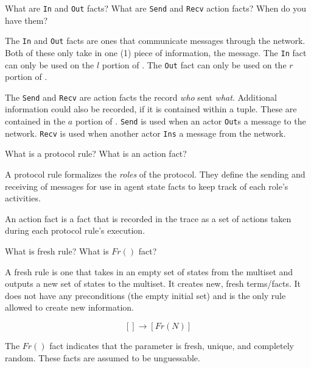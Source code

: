 \begin{questions}
\question{} What are \texttt{In} and \texttt{Out} facts? What are \texttt{Send} and \texttt{Recv} action facts? When do you have them?
  \begin{solution}
    The \texttt{In} and \texttt{Out} facts are ones that communicate messages through the network.
    Both of these only take in one (1) piece of information, the message.
    The \texttt{In} fact can only be used on the $l$ portion of .
    The \texttt{Out} fact can only be used on the $r$ portion of .

    The \texttt{Send} and \texttt{Recv} are action facts the record \emph{who} sent \emph{what}.
    Additional information could also be recorded, if it is contained within a tuple.
    These are contained in the $a$ portion of .
    \texttt{Send} is used when an actor \texttt{Out}s a message to the network.
    \texttt{Recv} is used when another actor \texttt{Ins} a message from the network.
  \end{solution}

\question{} What is a protocol rule? What is an action fact?
  \begin{solution}
    A protocol rule formalizes the \emph{roles} of the protocol.
    They define the sending and receiving of messages for use in agent state facts to keep track of each role's activities.

    An action fact is a fact that is recorded in the trace as a set of actions taken during each protocol rule's execution.
  \end{solution}

\question{} What is fresh rule? What is $Fr()$ fact?
  \begin{solution}
    A fresh rule is one that takes in an empty set of states from the multiset and outputs a new set of states to the multiset.
    It creates new, fresh terms/facts.
    It does not have any preconditions (the empty initial set) and is the only rule allowed to create new information.

    \begin{equation}\label{eq:Fresh_Rule}
      [] \to [Fr(N)]
    \end{equation}

    The $Fr()$ fact indicates that the parameter is fresh, unique, and completely random.
    These facts are assumed to be unguessable.
  \end{solution}


\end{questions}
